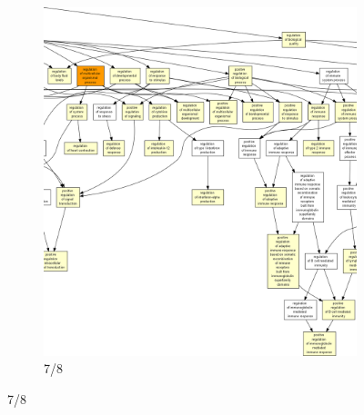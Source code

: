 \begin{figure}[p]
\ContinuedFloat
\begin{subfigure}{\textwidth}
\includegraphics[width=\textwidth]
{Figures/tfc-go-all-graph/tfc-go-all-graph_6.png}
\caption{7/8}
\end{subfigure}
\end{figure}

